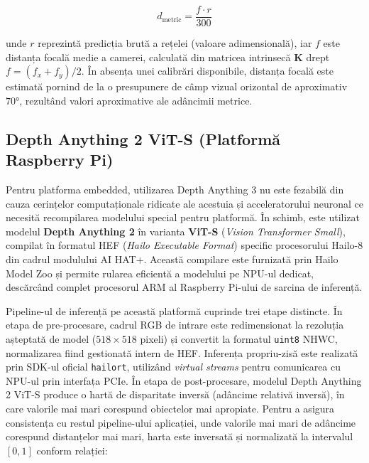 \begin{equation}
    d_{\text{metric}} = \frac{f \cdot r}{300}
\end{equation}

\noindent unde $r$ reprezintă predicția brută a rețelei (valoare adimensională), iar $f$ este distanța focală medie a camerei, calculată din matricea intrinsecă $\mathbf{K}$ drept $f = (f_x + f_y) / 2$. În absența unei calibrări disponibile, distanța focală este estimată pornind de la o presupunere de câmp vizual orizontal de aproximativ $70°$, rezultând valori aproximative ale adâncimii metrice.

\subsection{Depth Anything 2 ViT-S (Platformă Raspberry Pi)}

\par Pentru platforma embedded, utilizarea Depth Anything 3 nu este fezabilă din cauza cerințelor computaționale ridicate ale acestuia și acceleratorului neuronal ce necesită recompilarea modelului special pentru platformă. În schimb, este utilizat modelul \textbf{Depth Anything 2} \cite{yang2024depth} în varianta \textbf{ViT-S} (\textit{Vision Transformer Small}), compilat în formatul HEF (\textit{Hailo Executable Format}) specific procesorului Hailo-8 din cadrul modulului AI HAT+. Această compilare este furnizată prin Hailo Model Zoo și permite rularea eficientă a modelului pe NPU-ul dedicat, descărcând complet procesorul ARM al Raspberry Pi-ului de sarcina de inferență.

\par Pipeline-ul de inferență pe această platformă cuprinde trei etape distincte. În etapa de pre-procesare, cadrul RGB de intrare este redimensionat la rezoluția așteptată de model ($518 \times 518$ pixeli) și convertit la formatul \texttt{uint8} NHWC, normalizarea fiind gestionată intern de HEF. Inferența propriu-zisă este realizată prin SDK-ul oficial \texttt{hailort}, utilizând \textit{virtual streams} pentru comunicarea cu NPU-ul prin interfața PCIe. În etapa de post-procesare, modelul Depth Anything 2 ViT-S produce o hartă de disparitate inversă (adâncime relativă inversă), în care valorile mai mari corespund obiectelor mai apropiate. Pentru a asigura consistența cu restul pipeline-ului aplicației, unde valorile mai mari de adâncime corespund distanțelor mai mari, harta este inversată și normalizată la intervalul $[0, 1]$ conform relației:

